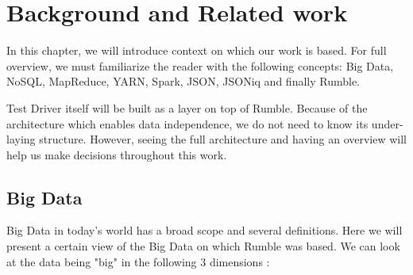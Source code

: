 \chapter{Background and Related work}
In this chapter, we will introduce context on which our work is based. For full overview, we must familiarize the reader with the following concepts: Big Data, NoSQL, MapReduce, YARN, Spark, JSON, JSONiq and finally Rumble.

Test Driver itself will be built as a layer on top of Rumble. Because of the architecture which enables data independence, we do not need to know its under-laying structure. However, seeing the full architecture and having an overview will help us make decisions throughout this work.

\section{Big Data}
Big Data in today's world has a broad scope and several definitions. Here we will present a certain view of the Big Data on which Rumble was based. We can look at the data being "big" in the following 3 dimensions \cite{BigDataCourse}: 
